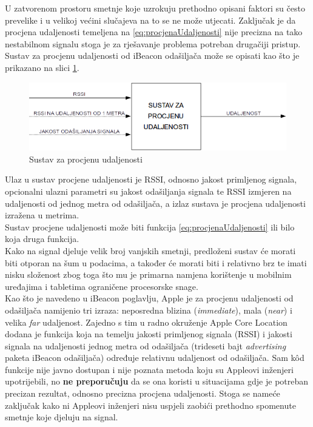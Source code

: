 U zatvorenom prostoru smetnje koje uzrokuju prethodno opisani faktori su često prevelike i u velikoj većini slučajeva na to se ne može utjecati. 
Zaključak je da procjena udaljenosti temeljena na \eqref{eq:procjenaUdaljenosti} nije precizna na tako nestabilnom signalu stoga je za rješavanje problema potreban drugačiji pristup.
\\

Sustav za procjenu udaljenosti od iBeacon odašiljača može se opisati kao što je prikazano na slici \ref{fig:sustavZaProcjenuUdaljenosti}.

\begin{figure}[H]
    \centering
    \includegraphics[scale=0.68]{pictures/sustav-za-procjenu-udaljenosti}
    \caption{Sustav za procjenu udaljenosti}
    \label{fig:sustavZaProcjenuUdaljenosti}
\end{figure}

Ulaz u sustav procjene udaljenosti je RSSI, odnosno jakost primljenog signala, opcionalni ulazni parametri su jakost odašiljanja signala te RSSI izmjeren na udaljenosti od jednog metra od odašiljača, a izlaz sustava je procjena udaljenosti izražena u metrima.
\\
Sustav procjene udaljenosti može biti funkcija \eqref{eq:procjenaUdaljenosti} ili bilo koja druga funkcija.
\\
Kako na signal djeluje velik broj vanjskih smetnji, predloženi sustav će morati biti otporan na šum u podacima, a također će morati biti i relativno brz te imati nisku složenost zbog toga što mu je primarna namjena korištenje u mobilnim uređajima i tabletima ograničene procesorske snage. 
\\

Kao što je navedeno u iBeacon poglavlju, Apple je za procjenu udaljenosti od odašiljača namijenio tri izraza: neposredna blizina (\textit{immediate}), mala (\textit{near}) i velika \textit{far} udaljenost.
Zajedno s tim u radno okruženje Apple Core Location dodana je funkcija koja na temelju jakosti primljenog signala (RSSI) i jakosti signala na udaljenosti jednog metra od odašiljača (trideseti bajt \textit{advertising} paketa iBeacon odašiljača) određuje relativnu udaljenost od odašiljača. 
Sam kôd funkcije nije javno dostupan i nije poznata metoda koju su Appleovi inženjeri upotrijebili, no \textbf{ne preporučuju} da se ona koristi u situacijama gdje je potreban precizan rezultat, odnosno precizna procjena udaljenosti. 
Stoga se nameće zaključak kako ni Appleovi inženjeri nisu uspjeli zaobići prethodno spomenute smetnje koje djeluju na signal.
\\

